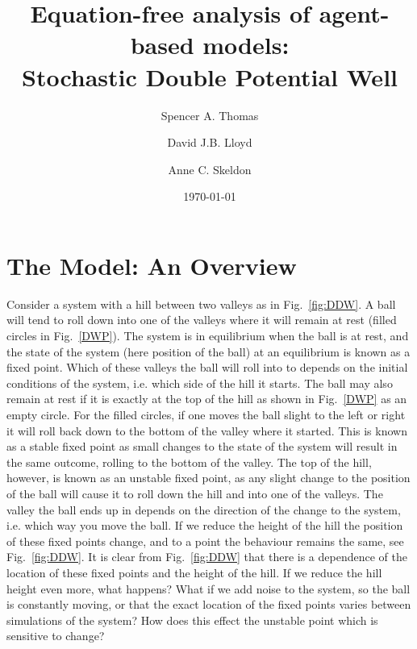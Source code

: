 \documentclass[11pt]{article}
\begin{document}
\title{Equation-free analysis of agent-based models:\\Stochastic Double Potential Well}

\author{Spencer A. Thomas}
\author{David J.B. Lloyd}
\author{Anne C. Skeldon}
\date{\today}
\maketitle



\section{The Model: An Overview}

Consider a system with a hill between two valleys as in Fig.~\ref{fig:DDW}. A ball will tend to roll down into one of the valleys where it will remain at rest (filled circles in Fig.~\ref{DWP}). The system is in equilibrium when the ball is at rest, and the state of the system (here position of the ball) at an equilibrium is known as a fixed point. Which of these valleys the ball will roll into to depends on the initial conditions of the system, i.e. which side of the hill it starts. The ball may also remain at rest if it is exactly at the top of the hill as shown in Fig.~\ref{DWP} as an empty circle. For the filled circles, if one moves the ball slight to the left or right it will roll back down to the bottom of the valley where it started. This is known as a stable fixed point as small changes to the state of the system will result in the same outcome, rolling to the bottom of the valley. The top of the hill, however, is known as an unstable fixed point, as any slight change to the position of the ball will cause it to roll down the hill and into one of the valleys. The valley the ball ends up in depends on the direction of the change to the system, i.e. which way you move the ball. If we reduce the height of the hill the position of these fixed points change, and to a point the behaviour remains the same, see Fig.~\ref{fig:DDW}. It is clear from Fig.~\ref{fig:DDW} that there is a dependence of the location of these fixed points and the height of the hill. If we reduce the hill height even more, what happens? What if we add noise to the system, so the ball is constantly moving, or that the exact location of the fixed points varies between simulations of the system? How does this effect the unstable point which is sensitive to change?
\end{document}
